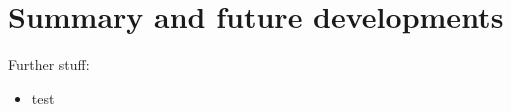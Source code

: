 \chapter{Summary and future developments}

Further stuff:
\begin{itemize}
  \item test
\end{itemize}